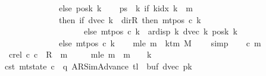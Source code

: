 \begin{isabellebody}
\ \ \ \ \ \ \ \ \ \ \ \ \ \ \ \ \ \ else\ posk{}\ k{\isachardoublequoteclose}\isanewline
\ \ \isamarkupfalse%
\ {\isacharquery}{\kern0pt}ps\ {\isacharequal}{\kern0pt}\ {\isachardoublequoteopen}{\isasymlambda}k{\isachardot}{\kern0pt}\ if\ k{\isacharunderscore}{\kern0pt}idx\ k\ {\isacharless}{\kern0pt}\ {\isacharquery}{\kern0pt}m{}\isanewline
\ \ \ \ \ \ \ \ \ \ \ \ \ \ \ \ \ \ then\ {\isacharparenleft}{\kern0pt}if\ dvec\ k\ {\isacharequal}{\kern0pt}\ dir{\isachardot}{\kern0pt}R\ then\ mt{\isacharunderscore}{\kern0pt}pos\ c{}\ k\isanewline
\ \ \ \ \ \ \ \ \ \ \ \ \ \ \ \ \ \ \ \ \ \ \ \ else\ mt{\isacharunderscore}{\kern0pt}pos\ c{}\ k\ {\isacharminus}{\kern0pt}\ ar{\isacharunderscore}{\kern0pt}disp\ {\isacharquery}{\kern0pt}k\ {\isacharparenleft}{\kern0pt}dvec\ k{\isacharparenright}{\kern0pt}\ {\isacharparenleft}{\kern0pt}posk{}\ k{\isacharparenright}{\kern0pt}{\isacharparenright}{\kern0pt}\isanewline
\ \ \ \ \ \ \ \ \ \ \ \ \ \ \ \ \ \ else\ mt{\isacharunderscore}{\kern0pt}pos\ c{}\ k{\isachardoublequoteclose}\isanewline
\ \ \isamarkupfalse%
\ m{}le{\isacharcolon}{\kern0pt}\ {\isachardoublequoteopen}{\isacharquery}{\kern0pt}m{}\ {\isasymle}\ k{\isacharunderscore}{\kern0pt}tm\ M\ {\isacharminus}{\kern0pt}\ {}{\isachardoublequoteclose}\ \isamarkupfalse%
\ simp\isanewline
\ \ \isamarkupfalse%
\ c{}\ m{}\ \isanewline
\ \ \ \ \ \ c{}{\isacharunderscore}{\kern0pt}rel{\isacharcolon}{\kern0pt}\ {\isachardoublequoteopen}{\isacharparenleft}{\kern0pt}c{}{\isacharcomma}{\kern0pt}\ c{}{\isacharparenright}{\kern0pt}\ {\isasymin}\ R{\isacharprime}{\kern0pt}\ {\isacharcircum}{\kern0pt}{\isacharcircum}{\kern0pt}\ m{}{\isachardoublequoteclose}\isanewline
\ \ \ \ \ m{}{\isacharunderscore}{\kern0pt}le{\isacharcolon}{\kern0pt}\ {\isachardoublequoteopen}m{}\ {\isasymle}\ {\isacharquery}{\kern0pt}m{}\ {\isacharasterisk}{\kern0pt}\ {\isacharparenleft}{\kern0pt}{}\ {\isacharasterisk}{\kern0pt}\ {\isacharquery}{\kern0pt}k{\isacharparenright}{\kern0pt}{\isachardoublequoteclose}\isanewline
\ \ \ \ \ c{}{\isacharunderscore}{\kern0pt}st{\isacharcolon}{\kern0pt}\ {\isachardoublequoteopen}mt{\isacharunderscore}{\kern0pt}state\ c{}\ {\isacharequal}{\kern0pt}\ {\isacharparenleft}{\kern0pt}q{\isacharcomma}{\kern0pt}\ AR{\isacharunderscore}{\kern0pt}SimAdvance{\isacharcomma}{\kern0pt}\ {\isacharquery}{\kern0pt}tl{\isacharcomma}{\kern0pt}\ {}{\isacharcomma}{\kern0pt}\ buf{}{\isacharcomma}{\kern0pt}\ dvec{\isacharcomma}{\kern0pt}\ {\isacharquery}{\kern0pt}pk{\isacharparenright}{\kern0pt}{\isachardoublequoteclose}\isanewline

\end{isabellebody}

